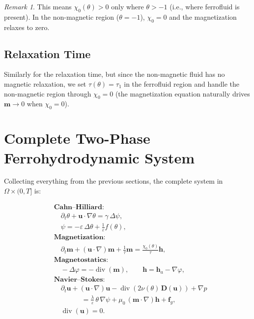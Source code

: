 \documentclass[11pt,a4paper]{article}
\theoremstyle{definition}
\theoremstyle{remark}
\newtheorem{remark}[proposition]{Remark}
\newcommand{\dt}{\partial_t}
\newcommand{\dv}{\operatorname{div}}
\newcommand{\grad}{\nabla}
\newcommand{\eps}{\varepsilon}
\newcommand{\bfu}{\bm{u}}
\newcommand{\bfm}{\bm{m}}
\newcommand{\bfh}{\bm{h}}
\newcommand{\bff}{\bm{f}}
\begin{document}
\begin{remark}
  This means $\chi_0(\theta) > 0$ only where $\theta > -1$ (i.e., where
  ferrofluid is present). In the non-magnetic region ($\theta = -1$),
  $\chi_0 = 0$ and the magnetization relaxes to zero.
\end{remark}

\subsection{Relaxation Time}

Similarly for the relaxation time, but since the non-magnetic fluid has
no magnetic relaxation, we set $\tau(\theta) = \tau_1$ in the ferrofluid
region and handle the non-magnetic region through $\chi_0 = 0$
(the magnetization equation naturally drives $\bfm \to 0$ when
$\chi_0 = 0$).


\section{Complete Two-Phase Ferrohydrodynamic System}
\label{sec:complete}

Collecting everything from the previous sections, the complete system in
$\Omega \times (0,T]$ is:

\bigskip
\begin{equation}
  \label{eq:system}
  \boxed{
  \begin{aligned}
    &\textbf{Cahn--Hilliard:} \\
    &\quad \dt\theta + \bfu \cdot \grad\theta
      = \gamma\,\Delta\psi, \\
    &\quad \psi = -\eps\,\Delta\theta + \frac{1}{\eps}f(\theta), \\[6pt]
    &\textbf{Magnetization:} \\
    &\quad \dt\bfm + (\bfu \cdot \grad)\bfm + \frac{1}{\tau}\bfm
      = \frac{\chi_0(\theta)}{\tau}\bfh, \\[6pt]
    &\textbf{Magnetostatics:} \\
    &\quad -\Delta\varphi = -\dv(\bfm), \qquad
      \bfh = \bfh_a - \grad\varphi, \\[6pt]
    &\textbf{Navier--Stokes:} \\
    &\quad \dt\bfu + (\bfu \cdot \grad)\bfu
      - \dv\!\left(2\nu(\theta)\,\bm{D}(\bfu)\right) + \grad p \\
    &\qquad\qquad = \frac{\lambda}{\eps}\,\theta\,\grad\psi
       + \mu_0\,(\bfm \cdot \grad)\bfh + \bff_g, \\
    &\quad \dv(\bfu) = 0.
  \end{aligned}
  }
\end{equation}
\end{document}
